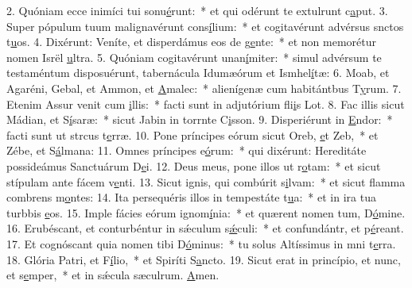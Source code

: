 2. Quóniam ecce inimíci tui sonu\uline{é}runt:~* et qui odérunt te extulrunt c\uline{a}put.
3. Super pópulum tuum malignavérunt cons\uline{í}lium:~* et cogitavérunt advérsus snctos t\uline{u}os.
4. Dixérunt: Veníte, et disperdámus eos de g\uline{e}nte:~* et non memorétur nomen Isrël \uline{u}ltra.
5. Quóniam cogitavérunt unan\uline{í}miter:~* simul advérsum te testaméntum disposuérunt, tabernácula Idumæórum et Ismhel\uline{í}tæ:
6. Moab, et Agaréni, Gebal, et Ammon, et \uline{A}malec:~* alienígenæ cum habitántbus T\uline{y}rum.
7. Etenim Assur venit cum \uline{i}llis:~* facti sunt in adjutórium fli\uline{i}s Lot.
8. Fac illis sicut Mádian, et S\uline{í}saræ:~* sicut Jabin in torrnte C\uline{i}sson.
9. Disperiérunt in \uline{E}ndor:~* facti sunt ut strcus t\uline{e}rræ.
10. Pone príncipes eórum sicut Oreb, \uline{e}t Zeb,~* et Zébe, et S\uline{á}lmana:
11. Omnes príncipes e\uline{ó}rum:~* qui dixérunt: Hereditáte possideámus Sanctuárum D\uline{e}i.
12. Deus meus, pone illos ut r\uline{o}tam:~* et sicut stípulam ante fácem v\uline{e}nti.
13. Sicut ignis, qui combúrit s\uline{i}lvam:~* et sicut flamma combrens m\uline{o}ntes:
14. Ita persequéris illos in tempestáte t\uline{u}a:~* et in ira tua turbbis \uline{e}os.
15. Imple fácies eórum ignom\uline{í}nia:~* et quærent nomen tum, D\uline{ó}mine.
16. Erubéscant, et conturbéntur in sǽculum s\uline{ǽ}culi:~* et confundántr, et p\uline{é}reant.
17. Et cognóscant quia nomen tibi D\uline{ó}minus:~* tu solus Altíssimus in mni t\uline{e}rra.
18. Glória Patri, et F\uline{í}lio,~* et Spiríti S\uline{a}ncto.
19. Sicut erat in princípio, et nunc, et s\uline{e}mper,~* et in sǽcula sæculrum. \uline{A}men.
